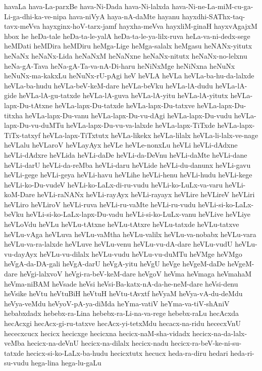 {havaLa
hava-La-parxBe
hava-Ni-Dada
hava-Ni-lalxda
hava-Ni-ne-La-miM-cu-ga-Li-ga-dhi-ka-ve-nipa
hava-niVyA
haya-nA-daMte
hayanu
hayxdhi-SAThx-taq-tavx-meVva
hayxginx-hoV-tarx-jamf
hayxha-meVva
hayxliM-ginaH
hayxvAgajxM
hbox
he
heDa-tale
heDa-ta-le-yalA
heDa-ta-le-ya-lilx-ruva
heLa-va-ni-dedx-sege
heMDati
heMDira
heMDiru
heMga-Lige
heMga-salalx
heMgasu
heNANx-yitutx
heNaNx
heNaNx-Lida
heNaNxM
heNaNxne
heNaNx-nitutx
heNaNx-no-lelxnu
heNa-gA-Tava
heNa-gA-Ta-va-nA-Di-haru
heNiNxMge
heNiNxna
heNuNx
heNuNx-ma-kakxLu
heNuNx-rU-pAgi
heV
heVLA
heVLa
heVLa-ba-hu-da-lalxde
heVLa-ba-hudu
heVLa-beV-keM-dare
heVLa-beVku
heVLa-lA-dudu
heVLa-lA-gide
heVLa-lA-gu-tatxde
heVLa-lA-guva
heVLa-lA-yitu
heVLa-lA-yitutx
heVLa-lapx-Du-tAtxne
heVLa-lapx-Du-tatxde
heVLa-lapx-Du-tatxve
heVLa-lapx-Du-titxha
heVLa-lapx-Du-vanu
heVLa-lapx-Du-vu-dAgi
heVLa-lapx-Du-vudu
heVLa-lapx-Du-vu-duMTu
heVLa-lapx-Du-vu-va-lalxde
heVLa-lapx-TiTxde
heVLa-lapx-TiTx-tatxyf
heVLa-lapx-TiTxtutx
heVLa-likekx
heVLa-lilalx
heVLa-li-lalx-ve-nage
heVLalu
heVLaroV
heVLayAyx
heVLe
heVLe-nonxLu
heVLi
heVLi-dAdxne
heVLi-dAdxre
heVLida
heVLi-daDe
heVLi-da-DeVnu
heVLi-daMte
heVLi-dane
heVLi-darU
heVLi-da-reMba
heVLi-daru
heVLide
heVLi-du-danunx
heVLi-gavu
heVLi-gege
heVLi-geya
heVLi-havu
heVLihe
heVLi-henu
heVLi-hudu
heVLi-kege
heVLi-ko-Du-vudeV
heVLi-ko-LaLx-di-ru-vudu
heVLi-ko-LuLx-va-varu
heVLi-koM-Dare
heVLi-raNANx
heVLi-rayAyx
heVLi-rayayx
heVLire
heVLireV
heVLiri
heVLiro
heVLiroV
heVLi-ruva
heVLi-ru-vaMte
heVLi-ru-vudu
heVLi-si-ko-LaLx-beVku
heVLi-si-ko-LaLx-lapx-Du-vadu
heVLi-si-ko-LuLx-vanu
heVLive
heVLiye
heVLoVdu
heVLu
heVLu-tAtxne
heVLu-tAtxre
heVLu-tatxde
heVLu-tatxve
heVLu-vAga
heVLuva
heVLu-vaMtha
heVLu-valilx
heVLu-va-nobabx
heVLu-vara
heVLu-va-ra-lalxde
heVLuve
heVLu-venu
heVLu-vu-dA-dare
heVLu-vudU
heVLu-vu-dayAyx
heVLu-vu-dilalx
heVLu-vudu
heVLu-vu-duMTu
heVMge
heVMgo
heVgA-da-DA-gali
heVgA-darU
heVgA-yitu
heVgU
heVge
heVgeM-daDe
heVgeM-dare
heVgi-lalxvoV
heVgi-ra-beV-keM-dare
heVgoV
heVma
heVmaga
heVmahaM
heVma-niBAM
heVsade
heVsi
heVsi-Ba-katx-nA-da-he-neM-dare
heVsi-denu
heVsike
heVtu
heVtuBiH
heVtuH
heVtu-tAvxtf
heVyaM
heVya-vA-du-deMdu
heVya-veMdu
heVyoV-pA-ya-diMda
heYma-vatiV
heYma-va-tiV-shAniV
hebabxdadx
hebebx-ra-Lina
hebebx-ra-Li-na-va-rege
hebebx-raLu
hecAcxda
hecAcxgi
hecAcx-gi-ru-tatxve
hecAcx-yi-tetxMdu
hecacx-na-ridu
hececxVnU
hececxcucx
hecicx
hecicxge
hecicxna
hecicx-naM-sha-vidadx
hecicx-na-da-lalx-veMba
hecicx-na-deVnU
hecicx-na-dilalx
hecicx-nadu
hecicx-ra-beV-ke-ni-su-tatxde
hecicx-si-ko-LaLx-ba-hudu
hecicxtutx
hecucx
heda-ra-diru
hedari
heda-ri-su-vudu
hega-lina
hega-lu-gaLu
}
